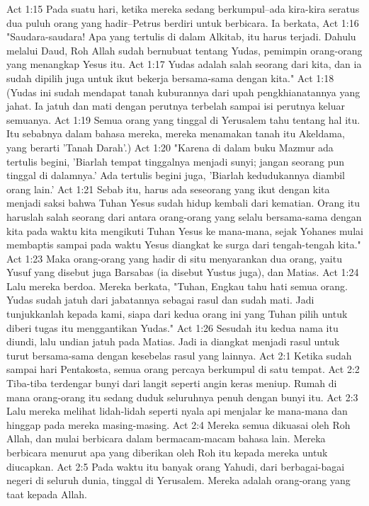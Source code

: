 Act 1:15  Pada suatu hari, ketika mereka sedang berkumpul--ada kira-kira seratus dua puluh orang yang hadir--Petrus berdiri untuk berbicara. Ia berkata,
Act 1:16  "Saudara-saudara! Apa yang tertulis di dalam Alkitab, itu harus terjadi. Dahulu melalui Daud, Roh Allah sudah bernubuat tentang Yudas, pemimpin orang-orang yang menangkap Yesus itu.
Act 1:17  Yudas adalah salah seorang dari kita, dan ia sudah dipilih juga untuk ikut bekerja bersama-sama dengan kita."
Act 1:18  (Yudas ini sudah mendapat tanah kuburannya dari upah pengkhianatannya yang jahat. Ia jatuh dan mati dengan perutnya terbelah sampai isi perutnya keluar semuanya.
Act 1:19  Semua orang yang tinggal di Yerusalem tahu tentang hal itu. Itu sebabnya dalam bahasa mereka, mereka menamakan tanah itu Akeldama, yang berarti 'Tanah Darah'.)
Act 1:20  "Karena di dalam buku Mazmur ada tertulis begini, 'Biarlah tempat tinggalnya menjadi sunyi; jangan seorang pun tinggal di dalamnya.' Ada tertulis begini juga, 'Biarlah kedudukannya diambil orang lain.'
Act 1:21  Sebab itu, harus ada seseorang yang ikut dengan kita menjadi saksi bahwa Tuhan Yesus sudah hidup kembali dari kematian. Orang itu haruslah salah seorang dari antara orang-orang yang selalu bersama-sama dengan kita pada waktu kita mengikuti Tuhan Yesus ke mana-mana, sejak Yohanes mulai membaptis sampai pada waktu Yesus diangkat ke surga dari tengah-tengah kita."
Act 1:23  Maka orang-orang yang hadir di situ menyarankan dua orang, yaitu Yusuf yang disebut juga Barsabas (ia disebut Yustus juga), dan Matias.
Act 1:24  Lalu mereka berdoa. Mereka berkata, "Tuhan, Engkau tahu hati semua orang. Yudas sudah jatuh dari jabatannya sebagai rasul dan sudah mati. Jadi tunjukkanlah kepada kami, siapa dari kedua orang ini yang Tuhan pilih untuk diberi tugas itu menggantikan Yudas."
Act 1:26  Sesudah itu kedua nama itu diundi, lalu undian jatuh pada Matias. Jadi ia diangkat menjadi rasul untuk turut bersama-sama dengan kesebelas rasul yang lainnya.
Act 2:1  Ketika sudah sampai hari Pentakosta, semua orang percaya berkumpul di satu tempat.
Act 2:2  Tiba-tiba terdengar bunyi dari langit seperti angin keras meniup. Rumah di mana orang-orang itu sedang duduk seluruhnya penuh dengan bunyi itu.
Act 2:3  Lalu mereka melihat lidah-lidah seperti nyala api menjalar ke mana-mana dan hinggap pada mereka masing-masing.
Act 2:4  Mereka semua dikuasai oleh Roh Allah, dan mulai berbicara dalam bermacam-macam bahasa lain. Mereka berbicara menurut apa yang diberikan oleh Roh itu kepada mereka untuk diucapkan.
Act 2:5  Pada waktu itu banyak orang Yahudi, dari berbagai-bagai negeri di seluruh dunia, tinggal di Yerusalem. Mereka adalah orang-orang yang taat kepada Allah.
